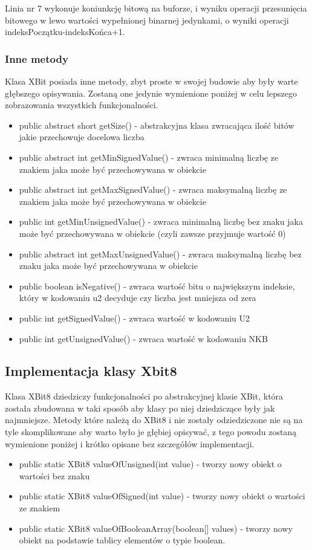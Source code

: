 Linia nr 7 wykonuje koniunkcję bitową na buforze, i wyniku operacji przesunięcia bitowego w lewo wartości wypełnionej binarnej jedynkami, o wyniki operacji indeksPoczątku-indeksKońca+1. 

\subsubsection{Inne metody}
Klasa XBit posiada inne metody, zbyt proste w swojej budowie aby były warte głębszego opisywania. Zostaną one jedynie wymienione poniżej w celu lepszego zobrazowania wszystkich funkcjonalności.
\begin{itemize}  
	\item public abstract short getSize() - abstrakcyjna klasa zwracająca ilość bitów jakie przechowuje docelowa liczba
	\item public abstract int getMinSignedValue() - zwraca minimalną liczbę ze znakiem jaka może być przechowywana w obiekcie
	\item public abstract int getMaxSignedValue() - zwraca maksymalną liczbę ze znakiem jaka może być przechowywana w obiekcie
	\item public int getMinUnsignedValue() - zwraca minimalną liczbę bez znaku jaka może być przechowywana w obiekcie (czyli zawsze przyjmuje wartość 0)
	\item public abstract int getMaxUnsignedValue() - zwraca maksymalną liczbę bez znaku jaka może być przechowywana w obiekcie
	\item public boolean isNegative() - zwraca wartość bitu o największym indeksie, który w kodowaniu u2 decyduje czy liczba jest mniejsza od zera
	\item public int getSignedValue() - zwraca wartość w kodowaniu U2
	\item public int getUnsignedValue() - zwraca wartość w kodowaniu NKB
\end{itemize}


\subsection{Implementacja klasy Xbit8}
Klasa XBit8 dziedziczy funkcjonalności po abstrakcyjnej klasie XBit, która została zbudowana w taki sposób aby klasy po niej dziedziczące były jak najmniejsze. Metody które należą do XBit8 i nie zostały odziedziczone nie są na tyle skomplikowane aby warto było je głębiej opisywać, z tego powodu zostaną wymienione poniżej i krótko opisane bez szczegółów implementacji.
\begin{itemize}  
	\item public static XBit8 valueOfUnsigned(int value) - tworzy nowy obiekt o wartości bez znaku
	\item public static XBit8 valueOfSigned(int value) - tworzy nowy obiekt o wartości ze znakiem
	\item public static XBit8 valueOfBooleanArray(boolean[] values) - tworzy nowy obiekt na podstawie tablicy elementów o typie boolean.
\end{itemize}

